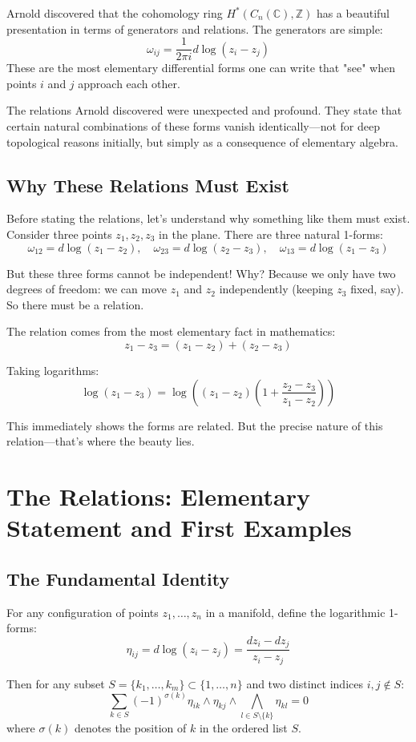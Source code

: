 Arnold discovered that the cohomology ring $H^*(C_n(\mathbb{C}), \mathbb{Z})$ has a beautiful presentation in terms of generators and relations. The generators are simple:
$$\omega_{ij} = \frac{1}{2\pi i} d\log(z_i - z_j)$$
These are the most elementary differential forms one can write that "see" when points $i$ and $j$ approach each other.

The relations Arnold discovered were unexpected and profound. They state that certain natural combinations of these forms vanish identically—not for deep topological reasons initially, but simply as a consequence of elementary algebra.

\subsection{Why These Relations Must Exist}

Before stating the relations, let's understand why something like them must exist. Consider three points $z_1, z_2, z_3$ in the plane. There are three natural 1-forms:
$$\omega_{12} = d\log(z_1 - z_2), \quad \omega_{23} = d\log(z_2 - z_3), \quad \omega_{13} = d\log(z_1 - z_3)$$

But these three forms cannot be independent! Why? Because we only have two degrees of freedom: we can move $z_1$ and $z_2$ independently (keeping $z_3$ fixed, say). So there must be a relation.

The relation comes from the most elementary fact in mathematics:
$$z_1 - z_3 = (z_1 - z_2) + (z_2 - z_3)$$

Taking logarithms:
$$\log(z_1 - z_3) = \log((z_1 - z_2)(1 + \frac{z_2 - z_3}{z_1 - z_2}))$$

This immediately shows the forms are related. But the precise nature of this relation—that's where the beauty lies.

\section{The Relations: Elementary Statement and First Examples}

\subsection{The Fundamental Identity}

\begin{theorem}
For any configuration of points $z_1, \ldots, z_n$ in a manifold, define the logarithmic 1-forms:
$$\eta_{ij} = d\log(z_i - z_j) = \frac{dz_i - dz_j}{z_i - z_j}$$

Then for any subset $S = \{k_1, \ldots, k_m\} \subset \{1, \ldots, n\}$ and two distinct indices $i, j \notin S$:
$$\sum_{k \in S} (-1)^{\sigma(k)} \eta_{ik} \wedge \eta_{kj} \wedge \bigwedge_{l \in S\setminus\{k\}} \eta_{kl} = 0$$
where $\sigma(k)$ denotes the position of $k$ in the ordered list $S$.
\end{theorem}

